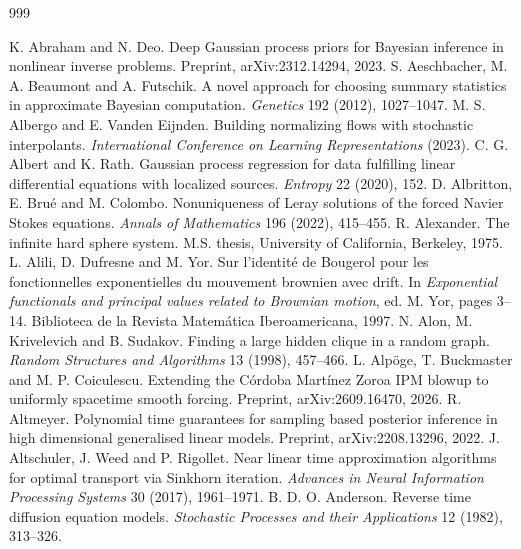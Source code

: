 \begin{thebibliography}{999}
\small\setlength{\itemsep}{4.25pt plus 2pt minus 1pt}%

 K. Abraham and N. Deo. Deep Gaussian process priors for Bayesian inference in nonlinear inverse problems. Preprint, arXiv:2312.14294, 2023.
 S. Aeschbacher, M. A. Beaumont and A. Futschik. A novel approach for choosing summary statistics in approximate Bayesian computation. \emph{Genetics} 192 (2012), 1027--1047.
 M. S. Albergo and E. Vanden Eijnden. Building normalizing flows with stochastic interpolants. \emph{International Conference on Learning Representations} (2023).
 C. G. Albert and K. Rath. Gaussian process regression for data fulfilling linear differential equations with localized sources. \emph{Entropy} 22 (2020), 152.
 D. Albritton, E. Bru\'e and M. Colombo. Nonuniqueness of Leray solutions of the forced Navier Stokes equations. \emph{Annals of Mathematics} 196 (2022), 415--455.
 R. Alexander. The infinite hard sphere system. M.S. thesis, University of California, Berkeley, 1975.
 L. Alili, D. Dufresne and M. Yor. Sur l'identit\'e de Bougerol pour les fonctionnelles exponentielles du mouvement brownien avec drift. In \emph{Exponential functionals and principal values related to Brownian motion}, ed. M. Yor, pages 3--14. Biblioteca de la Revista Matem\'atica Iberoamericana, 1997.
 N. Alon, M. Krivelevich and B. Sudakov. Finding a large hidden clique in a random graph. \emph{Random Structures and Algorithms} 13 (1998), 457--466.
 L. Alp\"oge, T. Buckmaster and M. P. Coiculescu. Extending the C\'ordoba Mart\'inez Zoroa IPM blowup to uniformly spacetime smooth forcing. Preprint, arXiv:2609.16470, 2026.
 R. Altmeyer. Polynomial time guarantees for sampling based posterior inference in high dimensional generalised linear models. Preprint, arXiv:2208.13296, 2022.
 J. Altschuler, J. Weed and P. Rigollet. Near linear time approximation algorithms for optimal transport via Sinkhorn iteration. \emph{Advances in Neural Information Processing Systems} 30 (2017), 1961--1971.
 B. D. O. Anderson. Reverse time diffusion equation models. \emph{Stochastic Processes and their Applications} 12 (1982), 313--326.

\end{thebibliography}
